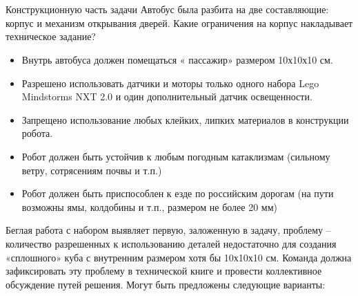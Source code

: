 {\hypertarget{lesson25x2}{}}\\\\	

Конструкционную часть задачи Автобус была разбита на две составляющие: корпус и механизм открывания дверей. Какие ограничения на корпус накладывает техническое задание?

\begin{itemize}
	\item Внутрь автобуса должен помещаться « пассажир» размером  10х10х10 см.
	\item Разрешено использовать датчики и моторы только одного набора Lego Mindstorms NXT 2.0 и один дополнительный датчик освещенности.
	\item Запрещено использование любых клейких, липких материалов в конструкции робота.
	\item Робот должен быть устойчив к любым погодным катаклизмам (сильному ветру, сотрясениям почвы и т.п.)
	\item Робот должен быть приспособлен к езде по российским дорогам (на пути возможны ямы, колдобины и т.п., размером не более 20 мм)
\end{itemize}

Беглая работа с набором выявляет первую, заложенную в задачу, проблему – количество разрешенных к использованию деталей недостаточно для создания «сплошного» куба с внутренним размером хотя бы 10х10х10 см.
Команда должна зафиксировать эту проблему в технической книге и провести коллективное обсуждение путей решения. Могут быть предложены следующие варианты:

